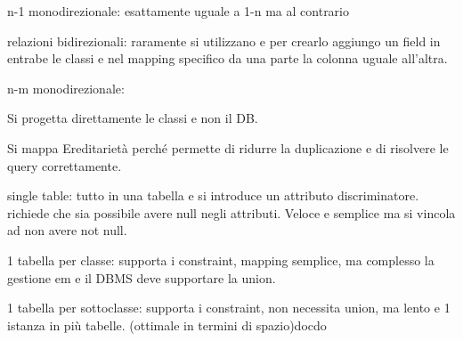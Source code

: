 n-1 monodirezionale: esattamente uguale a 1-n ma al contrario

relazioni bidirezionali: raramente si utilizzano e per crearlo aggiungo un field
in entrabe le classi e nel mapping specifico da una parte la colonna uguale all'altra.

n-m monodirezionale: 

Si progetta direttamente le classi e non il DB.

Si mappa Ereditarietà perché permette di ridurre la duplicazione e di risolvere
le query correttamente.

single table: tutto in una tabella e si introduce un attributo discriminatore.
richiede che sia possibile avere null negli attributi. Veloce e semplice ma 
si vincola ad non avere not null.

1 tabella per classe: supporta i constraint, mapping semplice, ma complesso la
gestione em e il DBMS deve supportare la union.

1 tabella per sottoclasse: supporta i constraint, non necessita union, ma lento
e 1 istanza in più tabelle. (ottimale in termini di spazio)docdo